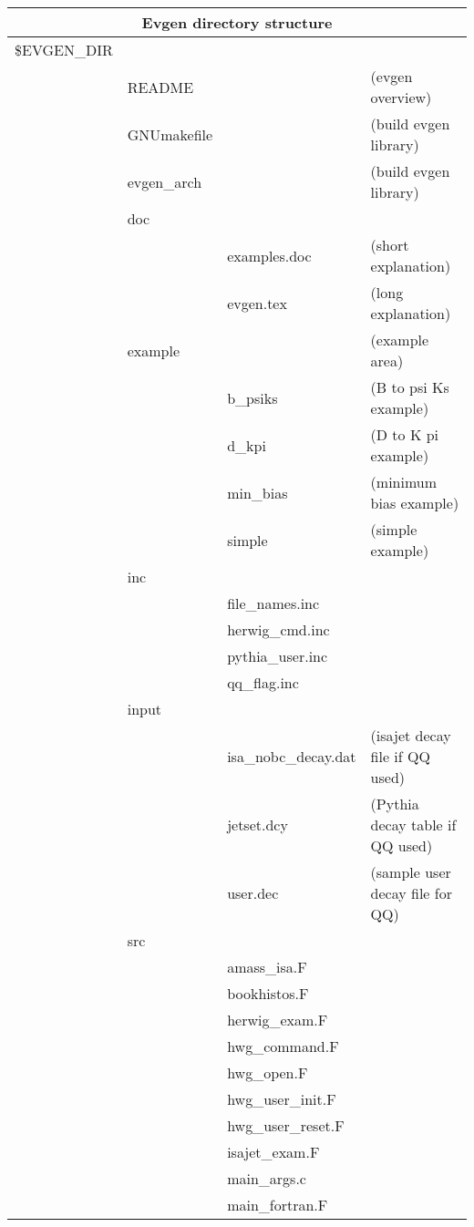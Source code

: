 \scriptsize
\begin{tabular}{|llll|} \hline
\multicolumn{4}{|c|}{Evgen directory structure} \\  \hline
\$EVGEN\_DIR  &    &     &    	\\
  & README   &     &     (evgen overview) \\
  & GNUmakefile   &     &     (build evgen library)	\\
  & evgen\_arch   &     &     (build evgen library)	\\
  &  doc & & \\
  &    &  examples.doc  &  (short explanation) \\
  &    &  evgen.tex  &  (long explanation) \\
  &  example  &    &  (example area) \\
  &    &  b\_psiks  &  (B to psi Ks example) \\
  &    &  d\_kpi  &  (D to K pi example) \\
  &    &  min\_bias  &  (minimum bias example) \\
  &    &  simple  &  (simple example) \\
  &  inc & & \\
  &    &  file\_names.inc & \\
  &    &  herwig\_cmd.inc & \\
  &    &  pythia\_user.inc & \\
  &    &  qq\_flag.inc & \\
  &  input & & \\
  &    &  isa\_nobc\_decay.dat  &  (isajet decay file if QQ used) \\
  &    &  jetset.dcy     &  (Pythia decay table if QQ used) \\
  &    &  user.dec     &  (sample user decay file for QQ) \\
  &  src & & \\
  &    &  amass\_isa.F & \\
  &    &  bookhistos.F & \\
  &    &  herwig\_exam.F & \\
  &    &  hwg\_command.F & \\
  &    &  hwg\_open.F & \\
  &    &  hwg\_user\_init.F & \\
  &    &  hwg\_user\_reset.F & \\
  &    &  isajet\_exam.F & \\
  &    &  main\_args.c & \\
  &    &  main\_fortran.F & \\

\end{tabular}
